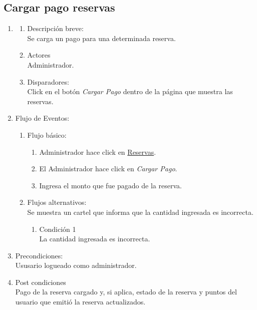\documentclass[a4paper,11pt]{article}
\begin{document}
\subsection{Cargar pago reservas}
\begin{enumerate}
    \item
    \begin{enumerate}
    \item Descripción breve: \\
        Se carga un pago para una determinada reserva.
    \item Actores \\
        Administrador.
    \item Disparadores: \\
        Click en el botón \emph{Cargar Pago} dentro de la
        página que muestra las reservas.
    \end{enumerate}

    \item Flujo de Eventos: 

    \begin{enumerate}

        \item Flujo básico:
	\begin{enumerate}
            \item Administrador hace click en \underline{Reservas}. 
	    \item El Administrador hace click en \emph{Cargar Pago}. 
	    \item Ingresa el monto que fue pagado de la reserva.
	\end{enumerate}

        \item Flujos alternativos:\\
            Se muestra un cartel que informa que la cantidad ingresada es
            incorrecta.
            \begin{enumerate}
                \item Condición 1 \\
                    La cantidad ingresada es incorrecta.
            \end{enumerate}

    \end{enumerate}

    \item Precondiciones: \\
        Ususario logueado como administrador.

    \item Post condiciones \\
        Pago de la reserva cargado y, si aplica, estado de la reserva y puntos
        del usuario que emitió la reserva actualizados.

\end{enumerate}
\end{document}
